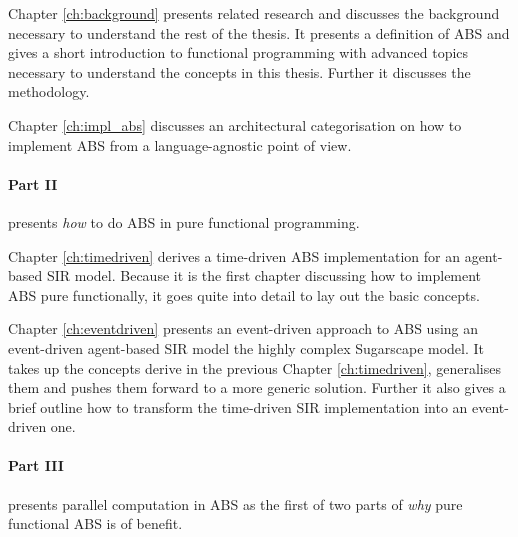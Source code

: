 \medskip

Chapter \ref{ch:background} presents related research and discusses the background necessary to understand the rest of the thesis. It presents a definition of ABS and gives a short introduction to functional programming with advanced topics necessary to understand the concepts in this thesis. Further it discusses the methodology.

\medskip

Chapter \ref{ch:impl_abs} discusses an architectural categorisation on how to implement ABS from a language-agnostic point of view. 

\medskip

\paragraph{Part II} presents \textit{how} to do ABS in pure functional programming. 
\medskip

Chapter \ref{ch:timedriven} derives a time-driven ABS implementation for an agent-based SIR model. Because it is the first chapter discussing how to implement ABS pure functionally, it goes quite into detail to lay out the basic concepts.

\medskip

Chapter \ref{ch:eventdriven} presents an event-driven approach to ABS using an event-driven agent-based SIR model the highly complex Sugarscape model. It takes up the concepts derive in the previous Chapter \ref{ch:timedriven}, generalises them and pushes them forward to a more generic solution. Further it also gives a brief outline how to transform the time-driven SIR implementation into an event-driven one.



\medskip

\paragraph{Part III} presents parallel computation in ABS as the first of two parts of \textit{why} pure functional ABS is of benefit.
\medskip

